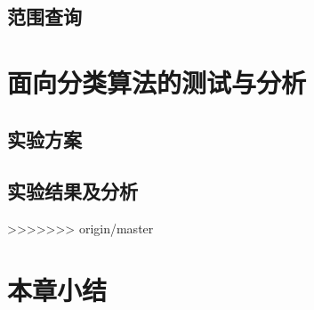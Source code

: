 \subsection{范围查询} 

\section{面向分类算法的测试与分析}

\subsection{实验方案}

\subsection{实验结果及分析}    

>>>>>>> origin/master
\section{本章小结}

